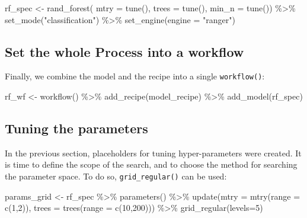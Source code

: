 \documentclass[
]{krantz}
\makeatletter
\newenvironment{Shaded}{\begin{snugshade}}{\end{snugshade}}
\newcommand{\AttributeTok}[1]{\textcolor[rgb]{0.61,0.61,0.61}{#1}}
\newcommand{\DecValTok}[1]{\textcolor[rgb]{0.06,0.06,0.06}{#1}}
\newcommand{\FunctionTok}[1]{\textcolor[rgb]{0,0,0}{#1}}
\newcommand{\NormalTok}[1]{#1}
\newcommand{\OtherTok}[1]{\textcolor[rgb]{0.37,0.37,0.37}{#1}}
\newcommand{\SpecialCharTok}[1]{\textcolor[rgb]{0,0,0}{#1}}
\newcommand{\StringTok}[1]{\textcolor[rgb]{0.5,0.5,0.5}{#1}}
\newenvironment{kframe}{%
\medskip{}
\setlength{\fboxsep}{.8em}
 \def\at@end@of@kframe{}%
 \ifinner\ifhmode%
  \def\at@end@of@kframe{\end{minipage}}%
  \begin{minipage}{\columnwidth}%
 \fi\fi%
 \def\FrameCommand##1{\hskip\@totalleftmargin \hskip-\fboxsep
 \colorbox{shadecolor}{##1}\hskip-\fboxsep
     \hskip-\linewidth \hskip-\@totalleftmargin \hskip\columnwidth}%
 \MakeFramed {\advance\hsize-\width
   \@totalleftmargin\z@ \linewidth\hsize
   \@setminipage}}%
 {\par\unskip\endMakeFramed%
 \at@end@of@kframe}
\renewenvironment{Shaded}{\begin{kframe}}{\end{kframe}}
\makeatother
\begin{document}
\begin{Shaded}
\begin{Highlighting}[]
\NormalTok{rf\_spec }\OtherTok{\textless{}{-}} \FunctionTok{rand\_forest}\NormalTok{(}
  \AttributeTok{mtry =} \FunctionTok{tune}\NormalTok{(),}
  \AttributeTok{trees =} \FunctionTok{tune}\NormalTok{(),}
  \AttributeTok{min\_n =} \FunctionTok{tune}\NormalTok{()) }\SpecialCharTok{\%\textgreater{}\%}
  \FunctionTok{set\_mode}\NormalTok{(}\StringTok{"classification"}\NormalTok{) }\SpecialCharTok{\%\textgreater{}\%} 
  \FunctionTok{set\_engine}\NormalTok{(}\AttributeTok{engine =} \StringTok{"ranger"}\NormalTok{)}
\end{Highlighting}
\end{Shaded}

\hypertarget{set-the-whole-process-into-a-workflow}{%
\subsection{Set the whole Process into a workflow}\label{set-the-whole-process-into-a-workflow}}

Finally, we combine the model and the recipe into a single \texttt{workflow()}:

\begin{Shaded}
\begin{Highlighting}[]
\NormalTok{rf\_wf }\OtherTok{\textless{}{-}} \FunctionTok{workflow}\NormalTok{() }\SpecialCharTok{\%\textgreater{}\%}
  \FunctionTok{add\_recipe}\NormalTok{(model\_recipe) }\SpecialCharTok{\%\textgreater{}\%} 
  \FunctionTok{add\_model}\NormalTok{(rf\_spec)}
\end{Highlighting}
\end{Shaded}

\hypertarget{tuning-the-parameters}{%
\subsection{Tuning the parameters}\label{tuning-the-parameters}}

In the previous section, placeholders for tuning hyper-parameters were created. It is time to define the scope of the search, and to choose the method for searching the parameter space. To do so, \texttt{grid\_regular()} can be used:

\begin{Shaded}
\begin{Highlighting}[]
\NormalTok{params\_grid }\OtherTok{\textless{}{-}}\NormalTok{ rf\_spec }\SpecialCharTok{\%\textgreater{}\%}
  \FunctionTok{parameters}\NormalTok{() }\SpecialCharTok{\%\textgreater{}\%}
  \FunctionTok{update}\NormalTok{(}\AttributeTok{mtry =} \FunctionTok{mtry}\NormalTok{(}\AttributeTok{range =} \FunctionTok{c}\NormalTok{(}\DecValTok{1}\NormalTok{,}\DecValTok{2}\NormalTok{)),}
         \AttributeTok{trees =} \FunctionTok{trees}\NormalTok{(}\AttributeTok{range =} \FunctionTok{c}\NormalTok{(}\DecValTok{10}\NormalTok{,}\DecValTok{200}\NormalTok{))) }\SpecialCharTok{\%\textgreater{}\%} 
  \FunctionTok{grid\_regular}\NormalTok{(}\AttributeTok{levels=}\DecValTok{5}\NormalTok{)}
\end{Highlighting}
\end{Shaded}
\end{document}
